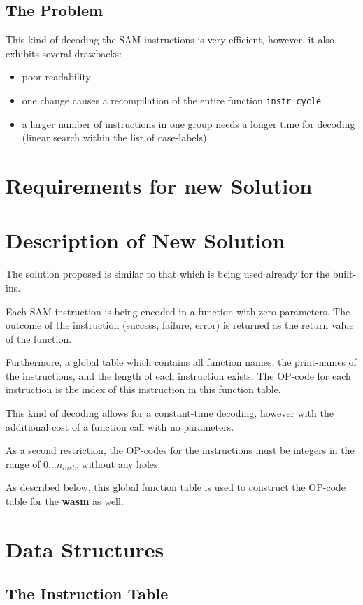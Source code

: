 \subsection{The Problem}
This kind of decoding the SAM instructions is very efficient,
however, it also exhibits several drawbacks:
\begin{itemize}
\item
poor readability
\item
one change causes a recompilation of the entire function {\tt instr\_cycle}
\item
a larger number of instructions in one group needs a longer time for
decoding (linear search within the list of case-labels)
\end{itemize}

\section{Requirements for new Solution}

\section{Description of New Solution}
The solution proposed is similar to that which is being used already
for the built-ins.

Each SAM-instruction is being encoded in a function with zero
parameters. The outcome of the instruction (success, failure, error)
is returned as the return value of the function.

Furthermore, a global table which contains all function names,
the print-names of the instructions, and the length of each instruction
exists.
The OP-code for each instruction is the index of this instruction
in this function table.

This kind of decoding allows for a constant-time decoding, however with the
additional cost of a function call with no parameters.

As a second restriction, the OP-codes for the instructions must be integers
in the range of $0\ldots n_{instr}$ without any holes.

As described below, this global function table is used to construct
the OP-code table for the {\bf wasm} as well.

\section{Data Structures}

\subsection{The Instruction Table}

